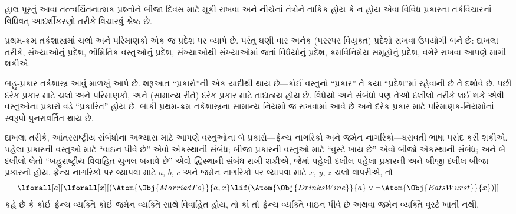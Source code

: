 હાલ પૂરતું આવા તત્ત્વચિંતનાત્મક પ્રશ્નોને બીજા દિવસ માટે મૂકી રાખવા
અને નીચેનાં તંત્રોને તાર્કિક હોય કે ન હોય એવા વિવિધ પ્રકારના
તર્કવિચારનાં વિધિવત્ આદર્શીકરણો તરીકે વિચારવું શ્રેષ્ઠ છે.
\endgroup


\begingroup
\makeatletter{}\makeatother


\label{guunit:OLP-0176}


પ્રથમ-ક્રમ તર્કશાસ્ત્રમાં ચલો અને પરિમાણકો એક જ પ્રદેશ પર
વ્યાપે છે. પરંતુ ઘણી વાર અનેક (પરસ્પર વિયુક્ત) પ્રદેશો રાખવા
ઉપયોગી બને છે: દાખલા તરીકે, સંખ્યાઓનું પ્રદેશ, ભૌમિતિક વસ્તુઓનું
પ્રદેશ, સંખ્યાઓથી સંખ્યાઓમાં જતાં વિધેયોનું પ્રદેશ,
ક્રમવિનિમેય સમૂહોનું પ્રદેશ, વગેરે રાખવા આપણે માગી શકીએ.

બહુ-પ્રકાર તર્કશાસ્ત્ર આવું માળખું આપે છે. શરૂઆત ``પ્રકારો''ની એક
યાદીથી થાય છે---કોઈ વસ્તુનો ``પ્રકાર'' તે કયા ``પ્રદેશ''માં રહેવાની
છે તે દર્શાવે છે. પછી દરેક પ્રકાર માટે ચલો અને પરિમાણકો, અને
(સામાન્ય રીતે) દરેક પ્રકાર માટે તાદાત્મ્ય હોય છે. વિધેયો અને સંબંધો
પણ તેઓ દલીલો તરીકે લઈ શકે એવી વસ્તુઓના પ્રકારો વડે ``પ્રકારિત'' હોય
છે. બાકી પ્રથમ-ક્રમ તર્કશાસ્ત્રના સામાન્ય નિયમો જ રાખવામાં આવે છે અને
દરેક પ્રકાર માટે પરિમાણક-નિયમોનાં સ્વરૂપો પુનરાવર્તિત થાય છે.

દાખલા તરીકે, આંતરરાષ્ટ્રીય સંબંધોના અભ્યાસ માટે આપણે વસ્તુઓના બે
પ્રકારો---ફ્રેન્ચ નાગરિકો અને જર્મન નાગરિકો---ધરાવતી ભાષા પસંદ કરી
શકીએ. પહેલા પ્રકારની વસ્તુઓ માટે ``વાઇન પીવે છે'' એવો એકસ્થાની સંબંધ;
બીજા પ્રકારની વસ્તુઓ માટે ``વુર્સ્ટ ખાય છે'' એવો બીજો એકસ્થાની સંબંધ;
અને બે દલીલો લેતો ``બહુરાષ્ટ્રીય વિવાહિત યુગલ બનાવે છે'' એવો દ્વિસ્થાની
સંબંધ રાખી શકીએ, જેમાં પહેલી દલીલ પહેલા પ્રકારની અને બીજી દલીલ બીજા
પ્રકારની હોય. ફ્રેન્ચ નાગરિકો પર વ્યાપવા માટે $a$, $b$, $c$ અને જર્મન
નાગરિકો પર વ્યાપવા માટે $x$, $y$, $z$ ચલો વાપરીએ, તો
\[
\lforall[a][\lforall[x][(\Atom{\Obj{MarriedTo}}{a,x} \lif
(\Atom{\Obj{DrinksWine}}{a} \lor \lnot \Atom{\Obj{EatsWurst}}{x})]]
\]
કહે છે કે કોઈ ફ્રેન્ચ વ્યક્તિ કોઈ જર્મન વ્યક્તિ સાથે વિવાહિત હોય, તો
કાં તો ફ્રેન્ચ વ્યક્તિ વાઇન પીવે છે અથવા જર્મન વ્યક્તિ વુર્સ્ટ ખાતી
નથી.
\sourcecorrection{OLBYD-001}{મૂળની
\texttt{many-sorted-logic.tex}, પંક્તિ~38માં બીજા સાર્વત્રિક પરિમાણકને
\texttt{\string\lforall x]} તરીકે લખવામાં આવ્યો છે અને તેનો આરંભક
ચોરસ કૌંસ ખૂટે છે. અહીં સુમેળવાળું~\texttt{\string\lforall[x]}
પુનઃસ્થાપિત કર્યું છે.}

